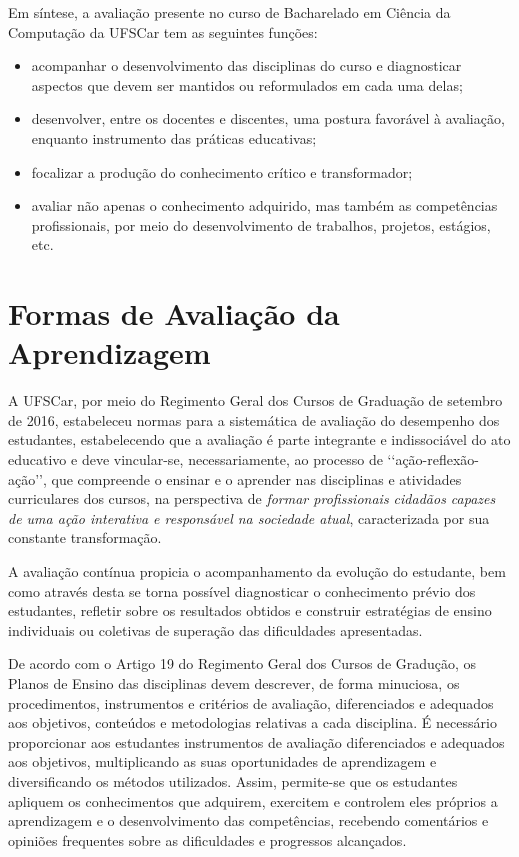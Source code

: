 
Em síntese, a avaliação presente no curso de Bacharelado em
Ciência da Computação da UFSCar tem as seguintes funções: 

\begin{itemize}
    \item acompanhar o desenvolvimento
das disciplinas do curso e diagnosticar aspectos que devem ser mantidos ou reformulados em cada uma delas;

    \item desenvolver, entre os docentes e discentes, uma postura favorável à avaliação, enquanto instrumento das práticas educativas;
    
    \item focalizar a produção do conhecimento crítico e transformador;
    
    \item avaliar não apenas o conhecimento adquirido, mas também as competências profissionais, por meio do desenvolvimento de trabalhos, projetos, estágios, etc.
\end{itemize}


\section{Formas de Avaliação da Aprendizagem}


A UFSCar, por meio do Regimento Geral dos Cursos de Graduação de setembro de 2016, estabeleceu normas para a sistemática de avaliação do desempenho dos estudantes, estabelecendo que a avaliação é parte integrante e indissociável do ato educativo e deve vincular-se, necessariamente, ao processo de \lq\lq ação-reflexão-ação\rq\rq, que compreende o ensinar e o aprender nas disciplinas e atividades curriculares dos cursos, na perspectiva de \textit{formar profissionais cidadãos capazes de uma ação interativa e responsável na sociedade atual}, caracterizada por sua constante transformação. 

A avaliação contínua propicia o acompanhamento da evolução do estudante, bem como através desta se torna possível diagnosticar o conhecimento prévio dos estudantes, refletir sobre os resultados obtidos e construir estratégias de ensino individuais ou coletivas de superação das dificuldades apresentadas.

De acordo com o Artigo 19 do Regimento Geral dos Cursos de Gradução, os Planos de Ensino das disciplinas devem descrever, de forma minuciosa, os procedimentos, instrumentos e critérios de avaliação,
diferenciados e adequados aos objetivos, conteúdos e metodologias relativas a cada disciplina. 
É necessário proporcionar aos estudantes instrumentos de avaliação diferenciados e adequados aos objetivos, multiplicando as suas oportunidades de aprendizagem e diversificando os métodos utilizados. Assim, permite-se que os estudantes apliquem os conhecimentos que adquirem, exercitem e controlem eles próprios a aprendizagem e o desenvolvimento das competências, recebendo comentários e opiniões frequentes sobre as dificuldades e progressos alcançados. 

